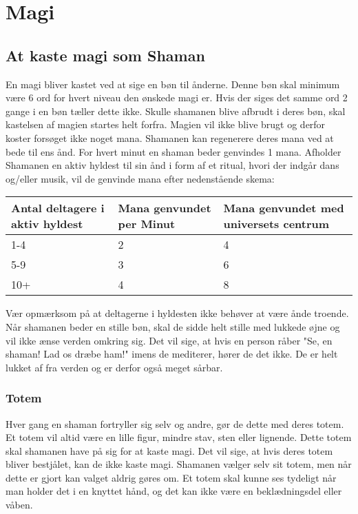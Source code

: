 \chapter{Magi}

\section{At kaste magi som Shaman}
En magi bliver kastet ved at sige en bøn til ånderne. Denne bøn skal minimum være 6 ord for hvert niveau den ønskede magi er. Hvis der siges det samme ord 2 gange i en bøn tæller dette ikke. Skulle shamanen blive afbrudt i deres bøn, skal kastelsen af magien startes helt forfra. Magien vil ikke blive brugt og derfor koster forsøget ikke noget mana. Shamanen kan regenerere deres mana ved at bede til ens ånd. For hvert minut en shaman beder genvindes 1 mana. Afholder Shamanen en aktiv hyldest til sin ånd i form af et ritual, hvori der indgår dans og/eller musik, vil de genvinde mana efter nedenstående skema:

\begin{table}[H]
    \centering
    \begin{tabular}{|p{}|p{}|p{}|}
    \rowcolor{cerulean!80}\hline
        Antal deltagere i aktiv hyldest & Mana genvundet per Minut & Mana genvundet med universets centrum \\\hline
        1-4&2&4\\\hline
        5-9&3&6\\\hline
        10+&4&8\\\hline
    \end{tabular}
\end{table}
Vær opmærksom på at deltagerne i hyldesten ikke behøver at være ånde troende. 
Når shamanen beder en stille bøn, skal de sidde helt stille med lukkede øjne og vil ikke ænse verden omkring sig. Det vil sige, at hvis en person råber "Se, en shaman! Lad os dræbe ham!" imens de mediterer, hører de det ikke. De er helt lukket af fra verden og er derfor også meget sårbar.

\subsection{Totem}
Hver gang en shaman fortryller sig selv og andre, gør de dette med deres totem. Et totem vil altid være en lille figur, mindre stav, sten eller lignende. Dette totem skal shamanen have på sig for at kaste magi. Det vil sige, at hvis deres totem bliver bestjålet, kan de ikke kaste magi. Shamanen vælger selv sit totem, men når dette er gjort kan valget aldrig gøres om. Et totem skal kunne ses tydeligt når man holder det i en knyttet hånd, og det kan ikke være en beklædningsdel eller våben.\\

